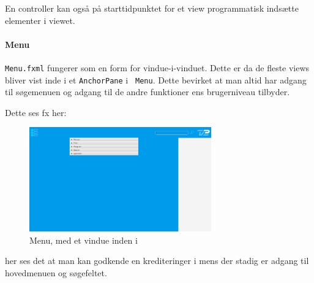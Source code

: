 En controller kan også på starttidpunktet for et view programmatisk indsætte
elementer i viewet. 

\paragraph{Menu}

\texttt{Menu.fxml} fungerer som en form for vindue-i-vinduet. Dette er da de
fleste views bliver vist inde i et \texttt{AnchorPane} i \texttt{
Menu}. Dette bevirket at man altid har adgang til søgemenuen og adgang til de
andre funktioner ens brugerniveau tilbyder. 

Dette ses fx her:
\begin{figure}[H]
    \centering
    \includegraphics[width=0.7\textwidth]{images/menu.png}
    \caption{Menu, med et vindue inden i}
\end{figure}

her ses det at man kan godkende en krediteringer i mens der stadig er adgang til
hovedmenuen og søgefeltet.
